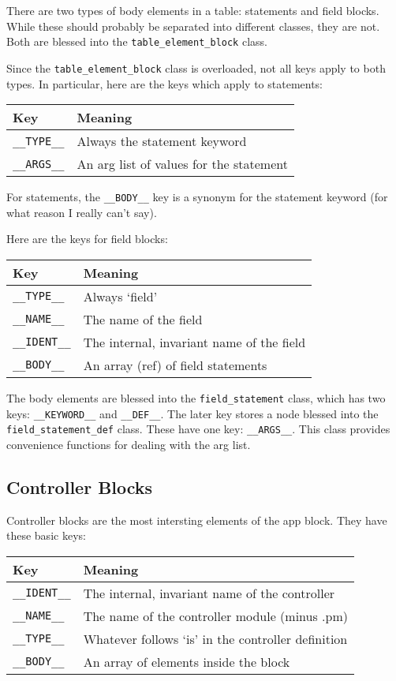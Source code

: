 There are two types of body elements in a table: statements and field blocks.
While these should probably be separated into different classes, they
are not.  Both are blessed into the \verb+table_element_block+ class.

Since the \verb+table_element_block+ class is overloaded, not all keys
apply to both types.  In particular, here are the keys which apply to
statements:

\begin{tabular}{l|l}
Key             & Meaning                                 \\
\hline
\verb+__TYPE__+ & Always the statement keyword            \\
\verb+__ARGS__+ & An arg list of values for the statement \\
\end{tabular}

For statements, the \verb+__BODY__+ key is a synonym for the statement
keyword (for what reason I really can't say).

Here are the keys for field blocks:

\begin{tabular}{l|l}
Key              & Meaning                                   \\
\hline
\verb+__TYPE__+  & Always `field'                            \\
\verb+__NAME__+  & The name of the field                     \\
\verb+__IDENT__+ & The internal, invariant name of the field \\
\verb+__BODY__+  & An array (ref) of field statements        \\
\end{tabular}

The body elements are blessed into the \verb+field_statement+ class,
which has two keys: \verb+__KEYWORD__+ and \verb+__DEF__+.  The later
key stores a node blessed into the \verb+field_statement_def+ class.
These have one key: \verb+__ARGS__+.  This class provides convenience
functions for dealing with the arg list.

\subsection*{Controller Blocks}

Controller blocks are the most intersting elements of the app block.
They have these basic keys:

\begin{tabular}{l|l}
Key              & Meaning                                            \\
\hline
\verb+__IDENT__+ & The internal, invariant name of the controller     \\
\verb+__NAME__+  & The name of the controller module (minus .pm)      \\
\verb+__TYPE__+  & Whatever follows `is' in the controller definition \\
\verb+__BODY__+  & An array of elements inside the block              \\
\end{tabular}

